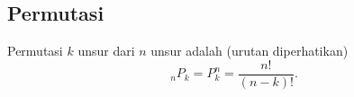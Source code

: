 \subsection{Permutasi}
Permutasi $k$ unsur dari $n$ unsur adalah (urutan diperhatikan)
$$_nP_k = P_k^n = \dfrac{n!}{(n-k)!}.$$